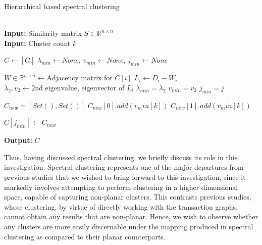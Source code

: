 \documentclass[journal]{IEEEtran}
\begin{document}
\begin{algorithm}
\caption{Hierarchical based spectral clustering \cite{spectral}}\label{alg:spectral-hierarchical}
\begin{algorithmic}[1]
 \\
\textbf{Input:} Similarity matrix $S\in\mathbb{R}^{n\times n}$ \\
\textbf{Input:} Cluster count $k$

\State $C \gets [G]$
    \State $\lambda_{min} \gets None$, $v_{min} \gets None$, $j_{min} \gets None$
    
        \State $W\in\mathbb{R}^{n\times n} \gets \text{Adjacency matrix for } C[i]$
        \State $L_i \gets D_i - W_i$
        \State $\lambda_2,v_2\gets\text{2nd eigenvalue, eigenvector of } L_i$
            \State $\lambda_{min} = \lambda_2$
            \State $v_{min} = v_2$
            \State $j_{min} = j$
        \EndIf
        
        \State $C_{new} = [Set(),Set()]$
                $C_{new}[0].add(v_min[k])$
            \Else
                $C_{new}[1].add(v_min[k])$
            \EndIf
        \EndFor
        
        \State $C[j_{min}] \gets C_{new}$
    \EndFor
    
\EndFor

\textbf{Output:} $C$
\EndProcedure
\end{algorithmic}
\end{algorithm}

Thus, having discussed spectral clustering, we briefly discuss its role in this investigation. Spectral clustering represents one of the major departures from previous studies that we wished to bring forward to this investigation, since it markedly involves attempting to perform clustering in a higher dimensional space, capable of capturing non-planar clusters. This contrasts previous studies, whose clustering, by virtue of directly working with the transaction graphs, cannot obtain any results that are non-planar. Hence, we wish to observe whether any clusters are more easily discernable under the mapping produced in spectral clustering as compared to their planar counterparts.
\end{document}
